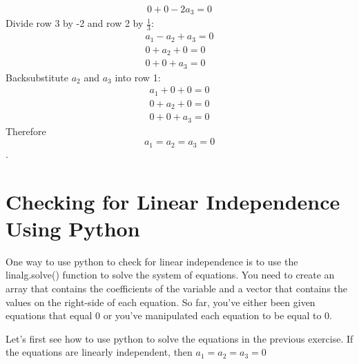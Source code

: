 \begin{Answer}[ref=vector_independence]
$$\begin{matrix}
			0 + 0 - 2a_3 = 0
		\end{matrix} $$
    Divide row 3 by -2 and row 2 by $\frac{1}{3}$:
    	$$\begin{matrix}
			a_1 - a_2 + a_3 = 0 \\
			0 +  a_2 +0  = 0 \\
			0  + 0  + a_3 = 0
		\end{matrix} $$
	Backsubstitute $a_2$ and $a_3$ into row 1:
	 	$$\begin{matrix}
			a_1 + 0 + 0 = 0 \\
			0 +  a_2 + 0   = 0 \\
			0   + 0  + a_3 = 0
		\end{matrix} $$
	 Therefore $$a_1 = a_2 = a_3 = 0$$.
\end{Answer}
    
\section{Checking for Linear Independence Using Python}  
One way to use python to check for linear independence is to use the linalg.solve() function to solve the system of equations. You need to create an array that contains the coefficients of the variable and a vector that contains the values on the right-side of each equation. So far, you've either been given equations that equal 0 or you've manipulated each equation to be equal to 0. 

Let's first see how to use python to solve the equations in the previous exercise. If the equations are linearly independent, then $a_1 = a_2 = a_3 = 0$

